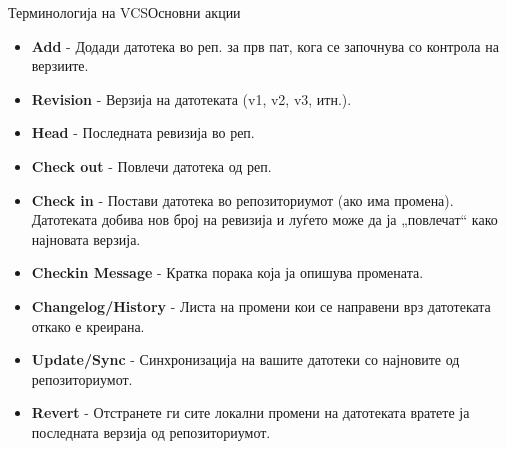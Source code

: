 \begin{frame}{Терминологија на VCS}{Основни акции}
\begin{scriptsize}
\begin{itemize}
    \item \textbf{Add} - Додади датотека во реп. за прв пат, кога се
    започнува со контрола на верзиите.
    \item \textbf{Revision} - Верзија на датотеката (v1, v2, v3,
    итн.).
    \item \textbf{Head} - Последната ревизија во реп.
    \item \textbf{Check out} - Повлечи датотека од реп.
    \item \textbf{Check in} - Постави датотека во репозиториумот (ако
    има промена). Датотеката добива нов број на ревизија и луѓето може да ја „повлечат“
        како најновата верзија.
    \item \textbf{Checkin Message} - Кратка порака која ја опишува
    промената.
    \item \textbf{Changelog/History} - Листа на промени кои се направени врз
    датотеката откако е креирана.
    \item \textbf{Update/Sync} - Синхронизација на вашите датотеки со
    најновите од репозиториумот.
    \item \textbf{Revert} - Отстранете ги сите локални промени на датотеката
        вратете ја последната верзија од репозиториумот.
\end{itemize}
\end{scriptsize}
\end{frame}

